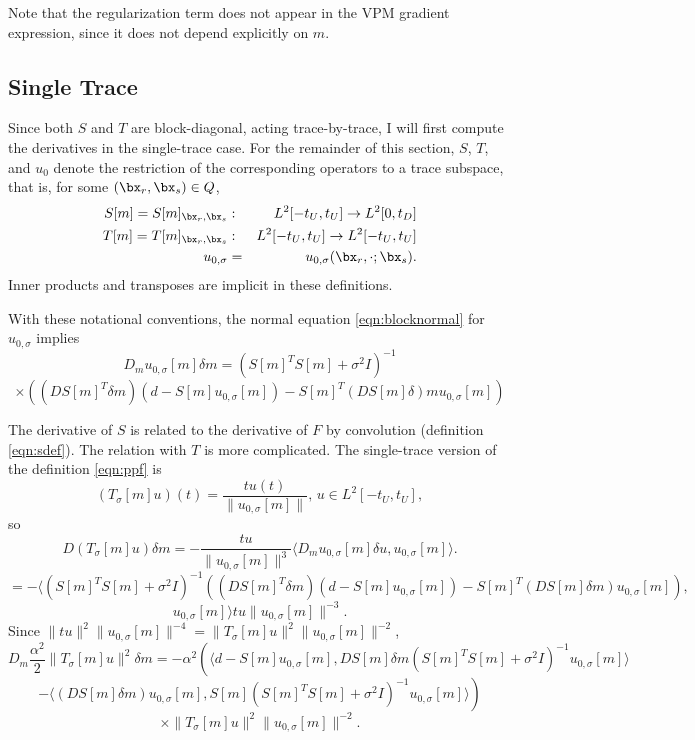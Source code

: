 Note that the regularization term does not appear in the VPM gradient expression, since it does not depend explicitly on $m$.

\subsection{Single Trace}

Since both $S$ and $T$ are block-diagonal, acting trace-by-trace, I will first compute the derivatives in the single-trace case. For the remainder of this section, $S$, $T$, and $u_0$ denote the restriction of the corresponding operators to a trace subspace, that is, for some $(\bx_r,\bx_s) \in Q$,
\begin{eqnarray*}
  S[m] = S[m]_{\bx_r,\bx_s}&: & L^2[-t_U,t_U] \rightarrow L^2[0,t_D] \\
  T[m] = T[m]_{\bx_r,\bx_s}&: & L^2[-t_U,t_U] \rightarrow L^2[-t_U,t_U] \\
  u_{0,\sigma} &=& u_{0,\sigma}(\bx_r,\cdot;\bx_s).
\end{eqnarray*}
Inner products and transposes are implicit in these definitions.

With these notational conventions, the normal equation \ref{eqn:blocknormal} for $u_{0,\sigma}$ implies
\[
  D_mu_{0,\sigma}[m] \delta m = (S[m]^TS[m] + \sigma^2I)^{-1}
\]
\begin{equation}
  \label{eqn:blockderiv}
  \times ((DS[m]^{T}\delta m) (d - S[m]u_{0,\sigma}[m]) - S[m]^T(DS[m]\delta) m u_{0,\sigma}[m])
\end{equation}

The derivative of $S$ is related to the derivative of $F$ by convolution (definition \ref{eqn:sdef}). The relation with $T$ is more complicated.
The single-trace version of the definition \ref{eqn:ppf} is
\[
  (T_{\sigma}[m]u)(t) = \frac{t u(t)}{\|u_{0,\sigma}[m]\|},\,u \in L^2[-t_U,t_U],
\]
so
\[
D(T_{\sigma}[m] u)\delta m = -\frac{t u}{\|u_{0,\sigma}[m]\|^3}\langle D_mu_{0,\sigma}[m]\delta u, u_{0,\sigma}[m]\rangle.
\]
\[
  =-\langle  (S[m]^TS[m] + \sigma^2I)^{-1}((DS[m]^{T}\delta m) (d - S[m]u_{0,\sigma}[m]) - S[m]^T(DS[m]\delta m) u_{0,\sigma}[m]),
\]
\[ u_{0,\sigma}[m] \rangle tu \|u_{0,\sigma}[m] \|^{-3}.
\]
Since $\|tu\|^2\| u_{0,\sigma}[m]\|^{-4} = \|T_{\sigma}[m]u\|^2\| u_{0,\sigma}[m]\|^{-2}$,
\[
  D_m \frac{\alpha^2}{2}\|T_{\sigma}[m]u\|^2\delta m =-\alpha^2\left( \langle d-S[m]u_{0,\sigma}[m], DS[m]\delta m (S[m]^TS[m] + \sigma^2I)^{-1}u_{0,\sigma}[m]\rangle \right.
\]
\[
  \left. - \langle (DS[m]\delta m)u_{0,\sigma}[m],S[m](S[m]^TS[m] + \sigma^2I)^{-1}u_{0,\sigma}[m]\rangle \right)
\]
\begin{equation}
  \label{eqn:penderiv}
  \times  \|T_{\sigma}[m]u\|^2\| u_{0,\sigma}[m]\|^{-2}.
\end{equation}

